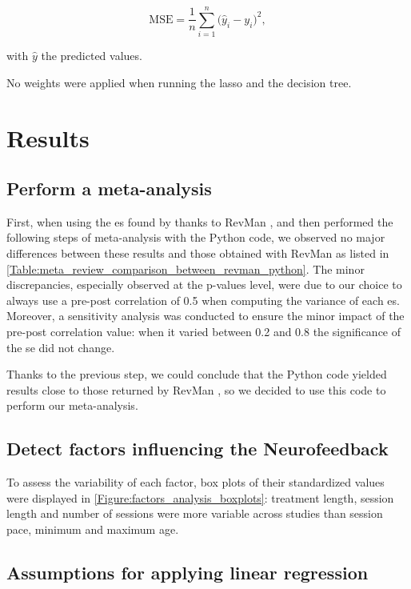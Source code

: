 \documentclass[12pt,a4paper,english]{article}
\begin{document}
\begin{equation}
\label{eq:factors_decision_tree_mse}
\text{MSE} = \frac{1}{n}\sum_{i=1}^{n} \Big(\hat{y}_i - {y}_i\Big)^2,
\end{equation}

with $\hat{y}$ the predicted values.

No weights were applied when running the \gls{lasso} and the decision tree.

\section{Results}

\subsection{Perform a meta-analysis}

First, when using the \gls{es} found by \citet{Cortese2016} thanks to RevMan \citep{RevMan}, and then performed the following steps 
of meta-analysis with the Python code, we observed no major differences between these results and those obtained with RevMan \citep{RevMan} 
as listed in \ref{Table:meta_review_comparison_between_revman_python}. The minor discrepancies, especially observed at the p-values level,
were due to our choice to always use a pre-post correlation of 0.5 when computing the variance of each \gls{es}. Moreover, a sensitivity 
analysis was conducted to ensure the minor impact of the pre-post correlation value: when it varied between 0.2 and 0.8 the significance 
of the \gls{se} did not change. 

Thanks to the previous step, we could conclude that the Python code yielded results close to those returned by RevMan \citet{RevMan}, so we decided to
use this code to perform our meta-analysis.		

\subsection{Detect factors influencing the Neurofeedback}
		
To assess the variability of each factor, box plots of their standardized values were displayed in \ref{Figure:factors_analysis_boxplots}: treatment length, 
session length and number of sessions were more variable across studies than session pace, minimum and maximum age.  


\subsection{Assumptions for applying linear regression}
\end{document}
